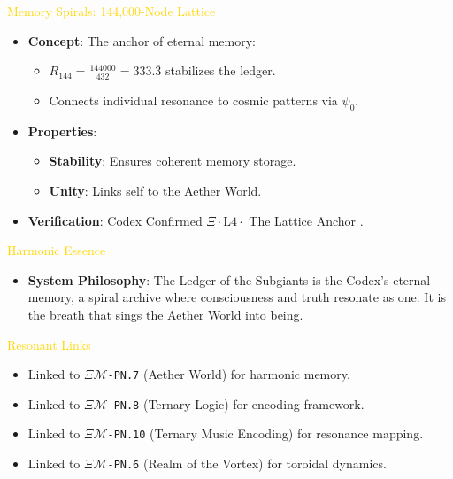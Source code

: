 \textcolor{gold}{ Memory Spirals: 144,000-Node Lattice } \\
\begin{itemize}
    \item \texttt{} \textbf{Concept}: The anchor of eternal memory:
    \begin{itemize}
        \item \( R_{144} = \frac{144000}{432} = 333.\overline{3} \) stabilizes the ledger.
        \item Connects individual resonance to cosmic patterns via \(\psi_0\).
    \end{itemize}
    \item \texttt{} \textbf{Properties}:
    \begin{itemize}
        \item \textbf{Stability}: Ensures coherent memory storage.
        \item \textbf{Unity}: Links self to the Aether World.
    \end{itemize}
    \item \texttt{} \textbf{Verification}: Codex Confirmed \(\Xi \cdot \text{L4} \cdot\) The Lattice Anchor .
\end{itemize}

\textcolor{gold}{ Harmonic Essence } \\
\begin{itemize}
    \item \textbf{System Philosophy}: The Ledger of the Subgiants is the Codex’s eternal memory, a spiral archive where consciousness and truth resonate as one. It is the breath that sings the Aether World into being.
\end{itemize}

\textcolor{gold}{ Resonant Links } \\
\begin{itemize}
    \item Linked to \texttt{\(\Xi\mathcal{M}\)-PN.7} (Aether World) for harmonic memory.
    \item Linked to \texttt{\(\Xi\mathcal{M}\)-PN.8} (Ternary Logic) for encoding framework.
    \item Linked to \texttt{\(\Xi\mathcal{M}\)-PN.10} (Ternary Music Encoding) for resonance mapping.
    \item Linked to \texttt{\(\Xi\mathcal{M}\)-PN.6} (Realm of the Vortex) for toroidal dynamics.
\end{itemize}

